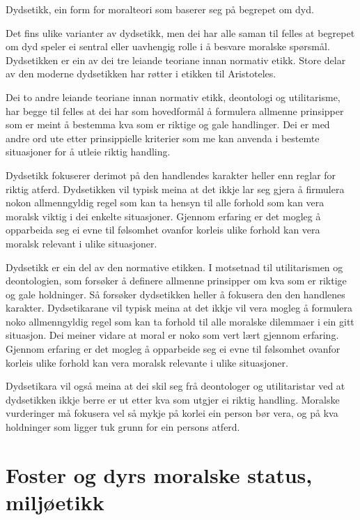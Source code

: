 \documentclass[a4paper]{IEEEtran}
\begin{document}
Dydsetikk, ein form for moralteori som baserer seg på begrepet om dyd.\newline

Det fins ulike varianter av dydsetikk, men dei har alle saman til felles at begrepet om dyd speler ei sentral eller uavhengig rolle i å besvare moralske spørsmål. Dydsetikken er ein av dei tre leiande teoriane innan normativ etikk. Store delar av den moderne dydsetikken har røtter i etikken til Aristoteles.\bigskip

Dei to andre leiande teoriane innan normativ etikk, deontologi og utilitarisme, har begge til felles at dei har som hovedformål å formulera allmenne prinsipper som er meint å bestemma kva som er riktige og gale handlinger. Dei er med andre ord ute etter prinsippielle kriterier som me kan anvenda i bestemte situasjoner for å utleie riktig handling.\bigskip

Dydsetikk fokuserer derimot på den handlendes karakter heller enn reglar for riktig atferd. Dydsetikken vil typisk meina at det ikkje lar seg gjera å firmulera nokon allmenngyldig regel som kan ta hensyn til alle forhold som kan vera moralsk viktig i dei enkelte situasjoner. Gjennom erfaring er det mogleg å opparbeida seg ei evne til følsomhet ovanfor korleis ulike forhold kan vera moralsk relevant i ulike situasjoner.\bigskip

Dydsetikk er ein del av den normative etikken. I motsetnad til utilitarismen og deontologien, som forsøker å definere allmenne prinsipper om kva som er riktige og gale holdninger. Så forsøker dydsetikken heller å fokusera den den handlenes karakter. Dydsetikarane vil typisk meina at det ikkje vil vera mogleg å formulera noko allmenngyldig regel som kan ta forhold til alle moralske dilemmaer i ein gitt situasjon. Dei meiner vidare at moral er noko som vert lært gjennom erfaring. Gjennom erfaring er det mogleg å opparbeide seg ei evne til følsomhet ovanfor korleis ulike forhold kan vera moralsk relevante i ulike situasjoner. 

Dydsetikara vil også meina at dei skil seg frå deontologer og utilitaristar ved at dydsetikken ikkje berre er ut etter kva som utgjer ei riktig handling. Moralske vurderinger må fokusera vel så mykje på korlei ein person bør vera, og på kva holdninger som ligger tuk grunn for ein persons atferd. \bigskip


\section{Foster og dyrs moralske status, miljøetikk}
\label{fdms}\bigskip
\end{document}
